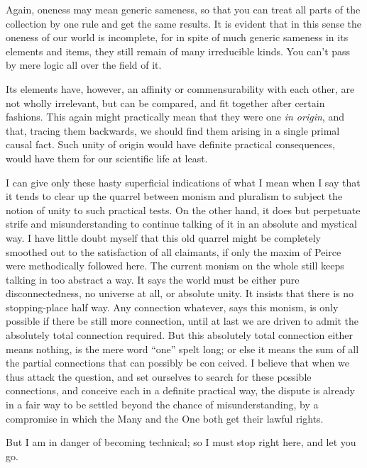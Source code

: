 \documentclass[12pt]{article}
\begin{document}
Again, oneness may mean generic sameness, so that you can treat all parts of the collection by one rule and get the same results. It is evident that in this sense the oneness of our world is incomplete, for in spite of much generic sameness in its elements and items, they still remain of many irreducible kinds. You can't pass by mere logic all over the field of it. 

Its elements have, however, an affinity or commensurability with each other, are not wholly irrelevant, but can be compared, and fit together after certain fashions. This again might practically mean that they were one \emph{in origin}, and that, tracing them backwards, we should find them arising in a single primal causal fact. Such unity of origin would have definite practical consequences, would have them for our scientific life at least. 

I can give only these hasty superficial indications of what I mean when I say that it tends to clear up the quarrel between monism and pluralism to subject the notion of unity to such practical tests. On the other hand, it does but perpetuate strife and misunderstanding to continue talking of it in an absolute and mystical way. I have little doubt myself that this old quarrel might be completely smoothed out to the satisfaction of all claimants, if only the maxim of Peirce were methodically followed here. The current monism on the whole still keeps talking in too abstract a way. It says the world must be either pure disconnectedness, no universe at all, or absolute unity. It insists that there is no stopping-place half way. Any connection whatever, says this monism, is only possible if there be still more connection, until at last we are driven to admit the absolutely total connection required. But this absolutely total connection either means nothing, is the mere word ``one'' spelt long; or else it means the sum of all the partial connections that can possibly be con ceived. I believe that when we thus attack the question, and set ourselves to search for these possible connections, and conceive each in a definite practical way, the dispute is already in a fair way to be settled beyond the chance of misunderstanding, by a compromise in which the Many and the One both get their lawful rights. 

But I am in danger of becoming technical; so I must stop right here, and let you go. 

\bigskip
\end{document}
